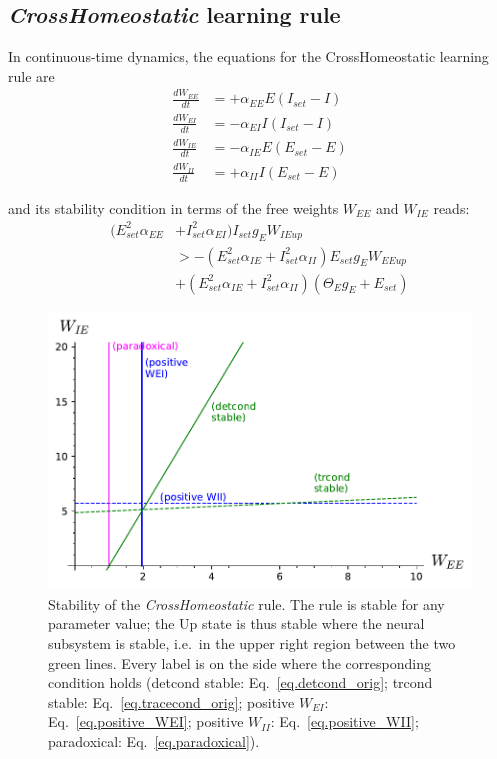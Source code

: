 \documentclass[twocolumn]{article}
\newcommand{\EE}{\mathit{EE}}
\newcommand{\EI}{\mathit{EI}}
\newcommand{\IE}{\mathit{IE}}
\newcommand{\II}{\mathit{II}}
\newcommand{\set}{\mathit{set}}
\newcommand{\up}{\mathit{up}}
\begin{document}
\subsection{{\em CrossHomeostatic} learning rule}

In continuous-time dynamics, the equations for the CrossHomeostatic learning rule are
\begin{equation}
\begin{aligned}
\frac{dW_{\EE}}{dt} & = +\alpha_{\EE} E (I_{\set} - I) \\
\frac{dW_{\EI}}{dt} & = -\alpha_{\EI} I (I_{\set} - I) \\
\frac{dW_{\IE}}{dt} & = -\alpha_{\IE} E (E_{\set} - E) \\
\frac{dW_{\II}}{dt} & = +\alpha_{\II} I (E_{\set} - E)
\end{aligned}
\label{eq.CH_equation}
\end{equation}

\noindent and its stability condition in terms of the free weights $W_{\EE}$ and $W_{\IE}$ reads:
\begin{equation}
\begin{aligned}
(E_{\set}^2 \alpha_{\EE} & + I_{\set}^2 \alpha_{\EI}) I_{\set} g_E W_{\IE\up} \\
& >
-(E_{\set}^2 \alpha_{\IE} + I_{\set}^2 \alpha_{\II}) E_{\set} g_E W_{\EE\up} \\
& +
(E_{\set}^2 \alpha_{\IE} + I_{\set}^2 \alpha_{\II}) (\Theta_E g_E + E_{\set})
\end{aligned}
\label{eq.CH_stable_cond_v1}
\end{equation}




\begin{figure}[ht]
\centering
\includegraphics[width=\linewidth]{CH_stability}
\caption{Stability of the {\em CrossHomeostatic} rule. The rule is stable for any parameter value; the Up state is thus stable where the neural subsystem is stable, i.e.\ in the upper right region between the two green lines. Every label is on the side where the corresponding condition  holds (detcond stable: Eq.\ \ref{eq.detcond_orig}; trcond stable: Eq.\ \ref{eq.tracecond_orig}; positive $W_{\EI}$: Eq.\ \ref{eq.positive_WEI}; positive $W_{\II}$: Eq.\ \ref{eq.positive_WII}; paradoxical: Eq.\ \ref{eq.paradoxical}).}
\label{fig.CH_stability}
\end{figure}
\end{document}
